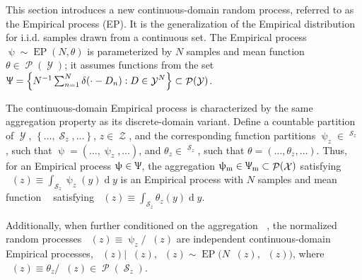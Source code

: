 \documentclass[12pt]{report}
\DeclareMathOperator{\drm}{\mathrm{d}}
\DeclareMathOperator{\Xcal}{\mathcal{X}}
\DeclareMathOperator{\Ycal}{\mathcal{Y}}
\DeclareMathOperator{\Zcal}{\mathcal{Z}}
\DeclareMathOperator{\Scal}{\mathcal{S}}
\DeclareMathOperator{\Pcal}{\mathcal{P}}
\DeclareMathOperator{\Rbbgeq}{\mathbb{R}_{\geq 0}}
\DeclareMathOperator{\EP}{\mathrm{EP}}
\DeclareMathOperator{\thetam}{\theta_\text{m}}
\DeclareMathOperator{\thetac}{\theta_\text{c}}
\DeclareMathOperator{\upthetac}{\uptheta_\text{c}}
\DeclareMathOperator{\uppsim}{\uppsi_\text{m}}
\DeclareMathOperator{\Uppsim}{\Uppsi_\text{m}}
\DeclareMathOperator{\uppsic}{\uppsi_\text{c}}
\begin{document}
This section introduces a new continuous-domain random process, referred to as the Empirical process (EP). It is the generalization of the Empirical distribution for i.i.d. samples drawn from a continuous set. The Empirical process $\uppsi \sim \EP(N,\theta)$ is parameterized by $N$ samples and mean function $\theta \in \Pcal(\Ycal)$; it assumes functions from the set $\Uppsi = \left\{ N^{-1} \sum_{n=1}^N \delta(\cdot - D_n) : D \in \Ycal^N \right\} \subset \Pcal(\Ycal)$.

The continuous-domain Empirical process is characterized by the same aggregation property as its discrete-domain variant. Define a countable partition of $\Ycal$, $\left\{ \ldots,\Scal_z,\ldots \right\}$, $z \in \Zcal$, and the corresponding function partitions $\uppsi_z \in \Rbbgeq^{\Scal_z}$, such that $\uppsi = \left( \ldots,\uppsi_z,\ldots \right)$, and $\theta_z \in \Rbbgeq^{\Scal_z}$, such that $\theta = \left( \ldots,\theta_z,\ldots \right)$. Thus, for an Empirical process $\uppsi \in \Uppsi$, the aggregation $\uppsim \in \Uppsim \subset \Pcal(\Xcal)$ satisfying $\uppsim(z) \equiv \int_{\Scal_z} \uppsi_z(y) {\drm}y$ is an Empirical process with $N$ samples and mean function $\thetam$ satisfying $\thetam(z) \equiv \int_{\Scal_z} \theta_z(y) {\drm}y$.

Additionally, when further conditioned on the aggregation $\uppsim$, the normalized random processes $\uppsic(z) \equiv \uppsi_z / \uppsim(z)$ are independent continuous-domain Empirical processes, $\uppsic(z) | \uppsim(z), \upthetac(z) \sim \EP\big(N \uppsim(z), \upthetac(z)\big)$, where $\thetac(z) \equiv \theta_z / \thetam(z) \in \Pcal(\Scal_z)$.
\end{document}
